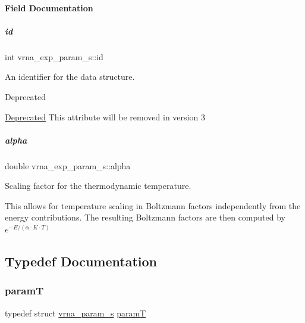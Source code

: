 \paragraph{Field Documentation}
\mbox{\label{group__energy__parameters_a378d5bcf2bae1f3ec84c912c7d3908d2}} 
\subparagraph{\texorpdfstring{id}{id}}
{\footnotesize\ttfamily int vrna\+\_\+exp\+\_\+param\+\_\+s\+::id}



An identifier for the data structure. 

\begin{DoxyRefDesc}{Deprecated}
\item[\hyperlink{deprecated__deprecated000101}{Deprecated}]This attribute will be removed in version 3 \end{DoxyRefDesc}
\mbox{\label{group__energy__parameters_a77145830b7bb01b36c3217b363310ef0}} 
\subparagraph{\texorpdfstring{alpha}{alpha}}
{\footnotesize\ttfamily double vrna\+\_\+exp\+\_\+param\+\_\+s\+::alpha}



Scaling factor for the thermodynamic temperature. 

This allows for temperature scaling in Boltzmann factors independently from the energy contributions. The resulting Boltzmann factors are then computed by $ e^{-E/(\alpha \cdot K \cdot T)} $ 

\subsection{Typedef Documentation}
\mbox{\label{group__energy__parameters_ga857dde86357d306cc902f0d8b2797659}} 
\subsubsection{\texorpdfstring{paramT}{paramT}}
{\footnotesize\ttfamily typedef struct \hyperlink{group__energy__parameters_structvrna__param__s}{vrna\+\_\+param\+\_\+s} \hyperlink{group__energy__parameters_ga857dde86357d306cc902f0d8b2797659}{paramT}}



